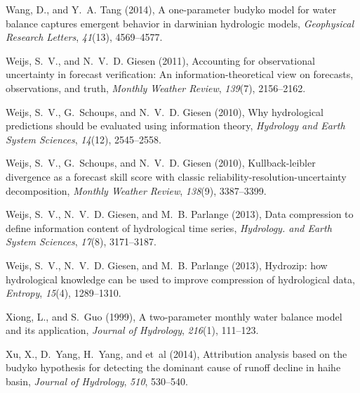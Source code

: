\documentclass[draft,wrr]{AGUTeX}
\begin{document}
\begin{article}
\begin{thebibliography}{59}
Wang, D., and Y.~A. Tang (2014), A one-parameter budyko model for water balance
  captures emergent behavior in darwinian hydrologic models,
  \textit{Geophysical Research Letters}, \textit{41}(13), 4569--4577.

Weijs, S.~V., and N.~V.~D. Giesen (2011), Accounting for observational
  uncertainty in forecast verification: An information-theoretical view on
  forecasts, observations, and truth, \textit{Monthly Weather Review},
  \textit{139}(7), 2156--2162.

Weijs, S.~V., G.~Schoups, and N.~V.~D. Giesen (2010{}), Why
  hydrological predictions should be evaluated using information theory,
  \textit{Hydrology and Earth System Sciences}, \textit{14}(12), 2545--2558.

Weijs, S.~V., G.~Schoups, and N.~V.~D. Giesen (2010{}),
  Kullback-leibler divergence as a forecast skill score with classic
  reliability-resolution-uncertainty decomposition, \textit{Monthly Weather
  Review}, \textit{138}(9), 3387--3399.

Weijs, S.~V., N.~V.~D. Giesen, and M.~B. Parlange (2013{}), Data
  compression to define information content of hydrological time series,
  \textit{Hydrology. and Earth System Sciences}, \textit{17}(8), 3171--3187.

Weijs, S.~V., N.~V.~D. Giesen, and M.~B. Parlange (2013{}),
  Hydrozip: how hydrological knowledge can be used to improve compression of
  hydrological data, \textit{Entropy}, \textit{15}(4), 1289--1310.

Xiong, L., and S.~Guo (1999), A two-parameter monthly water balance model and
  its application, \textit{Journal of Hydrology}, \textit{216}(1), 111--123.

Xu, X., D.~Yang, H.~Yang, and et~al (2014), Attribution analysis based on the
  budyko hypothesis for detecting the dominant cause of runoff decline in haihe
  basin, \textit{Journal of Hydrology}, \textit{510}, 530--540.


\end{thebibliography}
\end{article}
\end{document}
